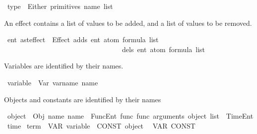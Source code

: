 \begin{isabellebody}
\isamarkupfalse%
\ type\ {\isacharequal}{\kern0pt}\ Either\ {\isacharparenleft}{\kern0pt}primitives{\isacharcolon}{\kern0pt}\ {\isachardoublequoteopen}name\ list{\isachardoublequoteclose}{\isacharparenright}{\kern0pt}%
\begin{isamarkuptext}%
An effect contains a list of values to be added, and a list of values
  to be removed.%
\end{isamarkuptext}\isamarkuptrue%
\isamarkupfalse%
\ {\isacharprime}{\kern0pt}ent\ ast{\isacharunderscore}{\kern0pt}effect\ {\isacharequal}{\kern0pt}\ Effect\ {\isacharparenleft}{\kern0pt}adds{\isacharcolon}{\kern0pt}\ {\isachardoublequoteopen}{\isacharparenleft}{\kern0pt}{\isacharprime}{\kern0pt}ent\ atom\ formula{\isacharparenright}{\kern0pt}\ list{\isachardoublequoteclose}{\isacharparenright}{\kern0pt}\isanewline
\ \ \ \ \ \ \ \ \ \ \ \ \ \ \ \ \ \ \ \ \ \ \ \ \ \ \ \ \ \ \ \ \ \ {\isacharparenleft}{\kern0pt}dels{\isacharcolon}{\kern0pt}\ {\isachardoublequoteopen}{\isacharparenleft}{\kern0pt}{\isacharprime}{\kern0pt}ent\ atom\ formula{\isacharparenright}{\kern0pt}\ list{\isachardoublequoteclose}{\isacharparenright}{\kern0pt}%
\begin{isamarkuptext}%
Variables are identified by their names.%
\end{isamarkuptext}\isamarkuptrue%
\isamarkupfalse%
\ variable\ {\isacharequal}{\kern0pt}\ Var\ {\isacharparenleft}{\kern0pt}varname{\isacharcolon}{\kern0pt}\ name{\isacharparenright}{\kern0pt}%
\begin{isamarkuptext}%
Objects and constants are identified by their names%
\end{isamarkuptext}\isamarkuptrue%
\isamarkupfalse%
\ object\ {\isacharequal}{\kern0pt}\ Obj\ {\isacharparenleft}{\kern0pt}name{\isacharcolon}{\kern0pt}\ name{\isacharparenright}{\kern0pt}\ {\isacharbar}{\kern0pt}\ FuncEnt\ {\isacharparenleft}{\kern0pt}func{\isacharcolon}{\kern0pt}\ func{\isacharparenright}{\kern0pt}\ {\isacharparenleft}{\kern0pt}arguments{\isacharcolon}{\kern0pt}\ {\isachardoublequoteopen}object\ list{\isachardoublequoteclose}{\isacharparenright}{\kern0pt}\ {\isacharbar}{\kern0pt}\ TimeEnt\ time\isanewline
\isanewline
{}\isamarkupfalse%
\ {\isachardoublequoteopen}term{\isachardoublequoteclose}\ {\isacharequal}{\kern0pt}\ VAR\ variable\ {\isacharbar}{\kern0pt}\ CONST\ object\isanewline
\isanewline
{}\isamarkupfalse%
\ {\isacharparenleft}{\kern0pt}\ VAR\ CONST\ %

\end{isabellebody}

